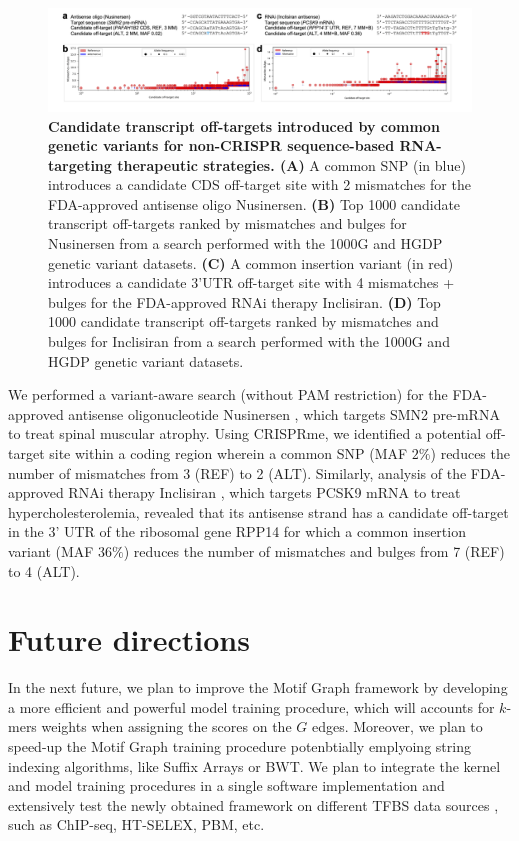 \documentclass[a4paper, titlepage, openright]{book}
\newcommand{\mychapter}[2]{
    \setcounter{chapter}{#1}
    \setcounter{section}{0}
    \chapter*{#2}
    \addcontentsline{toc}{chapter}{#2}
}
\begin{document}
\begin{figure}
	\centering
	\includegraphics[width=\textwidth]{figures/crisprme9.png}
	\caption[Candidate transcript off-targets introduced by common genetic variants for non-CRISPR sequence-based RNA-targeting therapeutic strategies]{\textbf{Candidate transcript off-targets introduced by common genetic variants for non-CRISPR sequence-based RNA-targeting therapeutic strategies. (A)} A common SNP (in blue) introduces a candidate CDS off-target site with 2 mismatches for the FDA-approved antisense oligo Nusinersen. \textbf{(B)} Top 1000 candidate transcript off-targets ranked by mismatches and bulges for Nusinersen from a search performed with the 1000G and HGDP genetic variant datasets. \textbf{(C)} A common insertion variant (in red) introduces a candidate 3’UTR off-target site with 4 mismatches + bulges for the FDA-approved RNAi therapy Inclisiran. \textbf{(D)} Top 1000 candidate transcript off-targets ranked by mismatches and bulges for Inclisiran from a search performed with the 1000G and HGDP genetic variant datasets.}
	\label{fig:crisprme9}
\end{figure} 
We performed a variant-aware search (without PAM restriction) for the FDA-approved antisense oligonucleotide Nusinersen \citep{finkel2017nusinersen,mercuri2018nusinersen}, which targets SMN2 pre-mRNA to treat spinal muscular atrophy. Using CRISPRme, we identified a potential off-target site within a coding region wherein a common SNP (MAF $2\%$) reduces the number of mismatches from 3 (REF) to 2 (ALT). Similarly, analysis of the FDA-approved RNAi therapy Inclisiran \citep{raal2020inclisiran}, which targets PCSK9 mRNA to treat hypercholesterolemia, revealed that its antisense strand has a candidate off-target in the 3’ UTR of the ribosomal gene RPP14 for which a common insertion variant (MAF $36\%$) reduces the number of mismatches and bulges from 7 (REF) to 4 (ALT).
\mychapter{8}{Future directions}
In the next future, we plan to improve the Motif Graph framework by developing a more efficient and powerful model training procedure, which will accounts for $k$-mers weights when assigning the scores on the $G$ edges. Moreover, we plan to speed-up the Motif Graph training procedure potenbtially emplyoing string indexing algorithms, like Suffix Arrays or BWT. We plan to integrate the kernel and model training procedures in a single software implementation and extensively test the newly obtained framework on different TFBS data sources , such as ChIP-seq, HT-SELEX, PBM, etc.
\end{document}

